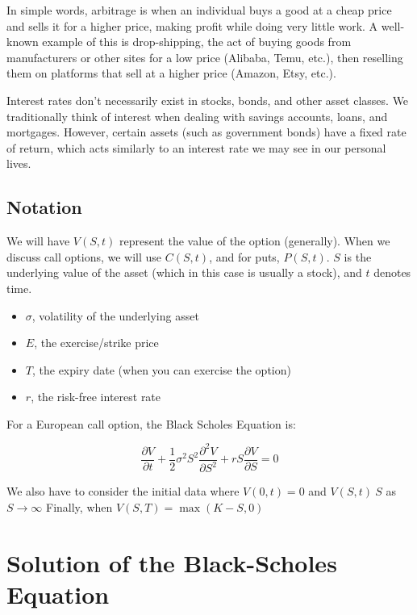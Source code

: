 \documentclass{article}
\begin{document}
In simple words, arbitrage is when an individual buys a good at a cheap price and sells it for a higher price, making profit while doing very little work. A well-known example of this is drop-shipping, the act of buying goods from manufacturers or other sites for a low price (Alibaba, Temu, etc.), then reselling them on platforms that sell at a higher price (Amazon, Etsy, etc.).

Interest rates don't necessarily exist in stocks, bonds, and other asset classes. We traditionally think of interest when dealing with savings accounts, loans, and mortgages. However, certain 
assets (such as government bonds) have a fixed rate of return, which acts similarly to an interest rate we may see in our personal lives.

\subsection*{Notation}



We will have $V(S,t)$ represent the value of the option (generally). When we discuss call options, we will use $C(S,t)$, and for puts, $P(S,t)$.
$S$ is the underlying value of the asset (which in this case is usually a stock), and $t$ denotes time.
\begin{itemize}
    \item $\sigma$, volatility of the underlying asset
    \item $E$, the exercise/strike price
    \item $T$, the expiry date (when you can exercise the option)
    \item $r$, the risk-free interest rate
    \end{itemize}

For a European call option, the Black Scholes Equation is:

\begin{equation}
    \frac{\partial V}{\partial t} + \frac{1}{2}\sigma^2S^2 \frac{\partial^2 V}{\partial S^2} + rS\frac{\partial V}{\partial S} = 0 
\end{equation}


We also have to consider the initial data where $V(0,t) = 0$ and $V(S,t) ~ S$ as $S \to \infty$
Finally, when $V(S,T) = \max{(K-S,0)}$


\section*{Solution of the Black-Scholes Equation}
\end{document}
